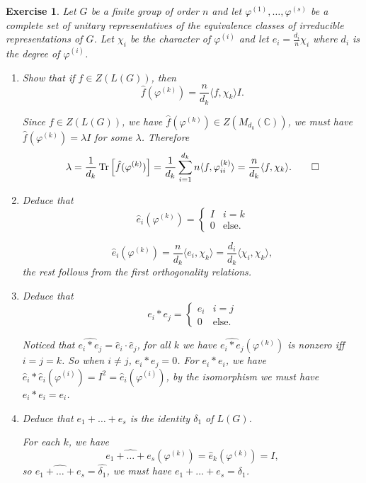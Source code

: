 \documentclass[11pt]{report}
\theoremstyle{mythm}
\let\oldendproof\endproof
\renewenvironment{proof}[1][\proofname]{%
  \oldproof[\normalfont \bfseries #1]%
}{\oldendproof}
\newtheorem{exercise}{Exercise}[chapter]
\renewcommand*{\proofname}{Proof}
\theoremstyle{myans}
\newcommand{\bbC}{\mathbb C}
\DeclareMathOperator{\Tr}{Tr}
\newcommand{\ang}[1]{\langle #1 \rangle}
\begin{document}
\setcounter{exercise}{10}
\begin{exercise}
  Let $G$ be a finite group of order $n$ and let $\varphi^{(1)},\dots,\varphi^{(s)}$
  be a complete set of unitary representatives of the equivalence classes of
  irreducible representations of $G$. Let $\chi_i$ be the character of $\varphi^{(i)}$
  and let $e_i = \frac{d_i}n \chi_i$ where $d_i$ is the degree of $\varphi^{(i)}$.
  \begin{enumerate}
    \item Show that if $f \in Z(L(G))$, then
    \[ \hat f(\varphi^{(k)}) = \frac{n}{d_k} \ang{f, \chi_k} I. \]
    \begin{proof}
      Since $f\in Z(L(G))$, we have $\hat f (\varphi^{(k)}) \in Z(M_{d_k}(\bbC))$,
      we must have $\hat f(\varphi^{(k)}) = \lambda I$ for some $\lambda$.
      Therefore
      \[ \lambda = \frac 1{d_k}\Tr \left[\hat f(\varphi^{(k)})\right] = \frac 1{d_k} \sum_{i=1}^{d_k} n\ang{f, \varphi_{ii}^{(k)}}
      = \frac{n}{d_k} \ang{f, \chi_k}. \qedhere \]
    \end{proof}
    \item Deduce that
    \[ \hat e_i(\varphi^{(k)}) = \begin{cases}
      I & i = k \\
      0 & \text{else.}
    \end{cases} \]
    \begin{proof}
      \[ \hat e_i(\varphi^{(k)}) = \frac{n}{d_k} \ang{e_i, \chi_k}
       = \frac{d_i}{d_k} \ang{\chi_i, \chi_k},  \]
      the rest follows from the first orthogonality relations.
    \end{proof}
    \item Deduce that
    \[ e_i * e_j = \begin{cases}
      e_i & i = j\\
      0 & \text{else.}
    \end{cases} \]
    \begin{proof}
      Noticed that $\widehat{e_i * e_j} = \hat e_i \cdot \hat e_j$,
      for all $k$ we have $\widehat{e_i * e_j}(\varphi^{(k)})$ is nonzero iff $i=j=k$.
      So when $i\neq j$, $e_i *e_j = 0$. For $e_i * e_i$, we have $\hat e_i * \hat e_i(\varphi^{(i)}) = I^2 = \hat e_i(\varphi^{(i)})$,
      by the isomorphism we must have $e_i * e_i = e_i$.
    \end{proof}
    \item Deduce that $e_1 + \dots + e_s$ is the identity $\delta_1$ of $L(G)$.
    \begin{proof}
      For each $k$, we have
      \[ \widehat{e_1 + \dots + e_s}(\varphi^{(k)}) = \hat e_k (\varphi^{(k)}) = I, \]
      so $\widehat{e_1 + \dots + e_s} = \widehat{\delta_1}$, we must have $e_1 + \dots + e_s = \delta_1$.
    \end{proof}
  \end{enumerate}
\end{exercise}
\end{document}
